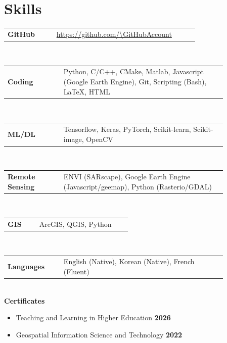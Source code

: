 \newcommand{\skill}[2]
  {\small \color{maincolor} 
    \begin{tabular}{@{} p{0.22\linewidth} p{0.64\linewidth}}
    \textbf{\color{hlcolor-0} #1} & \textcolor{maincolor}{#2}
    \end{tabular}}

\newcommand{\certification}[2]
    {\small #1 \hfill{\textbf{#2}}}
\newcommand{\github}
  {\small \url{https://github.com/\GitHubAccount}}


\section*{Skills}
\begin{cvcontent}
  \skill{GitHub}{\github}\\ [0.5mm]
  \skill{Coding}{Python, C/C++, CMake, Matlab, Javascript (Google Earth Engine), Git, Scripting (Bash), LaTeX, HTML}\\ [0.5mm]
  \skill{ML/DL}{Tensorflow, Keras, PyTorch, Scikit-learn, Scikit-image, OpenCV}\\[0.5mm]
  \skill{Remote Sensing}{ENVI (SARscape), Google Earth Engine (Javascript/geemap), Python (Rasterio/GDAL)} \\[0.5mm]
  \skill{GIS}{ArcGIS, QGIS, Python} \\[0.5mm]
  \skill{Languages}{English (Native), Korean (Native), French (Fluent)}
\\[3mm]
\textbf{Certificates}\\[-5mm]
\begin{itemize}[leftmargin=1.5cm]
    \setlength\itemsep{-0.25em}
    \item \certification{Teaching and Learning in Higher Education}{2026}
    \item \certification{Geospatial Information Science and Technology}{2022}
\end{itemize}

\end{cvcontent}
